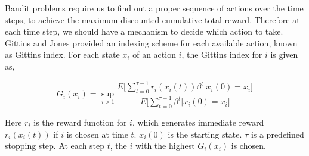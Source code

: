 \documentclass[english]{tktltiki}
\begin{document}
Bandit problems require us to find out a proper sequence of actions over the time steps, to achieve the maximum discounted cumulative total reward. Therefore at each time step, we should have a mechanism to decide which action to take. Gittins and Jones \cite{gittins_indices} provided an indexing scheme for each available action, known as Gittins index. For each state $x_i$ of an action $i$, the Gittins index for $i$ is given as,

\begin{equation}
G_i(x_i) = \sup_{\tau > 1}{\frac{E\Big[\sum_{t = 0}^{\tau - 1} r_i(x_i(t))\beta^t | x_i(0) = x_i\Big]}{E\Big[\sum_{t = 0}^{\tau - 1}\beta^t | x_i(0) = x_i\Big]}}
\end{equation}

Here $r_i$ is the reward function for $i$, which generates immediate reward  $r_i(x_i(t))$ if $i$ is chosen at time $t$. $x_i(0)$ is the starting state. $\tau$ is a predefined stopping step. At each step $t$, the $i$ with the highest $G_i(x_i)$ is chosen.
\end{document}
